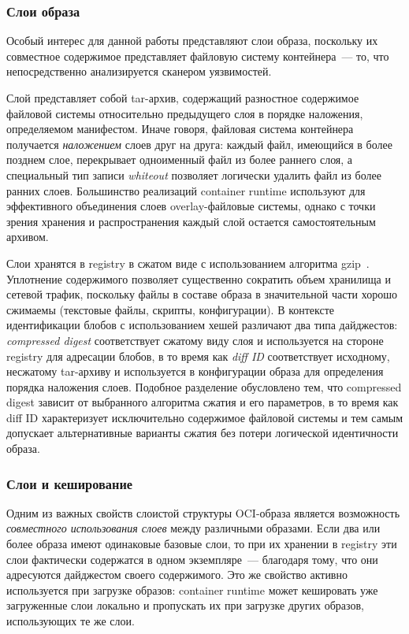 \subsubsection{Слои образа}

Особый интерес для данной работы представляют слои образа, поскольку их совместное содержимое представляет файловую систему контейнера~--- то, что непосредственно анализируется сканером уязвимостей.

Слой представляет собой tar-архив, содержащий разностное содержимое файловой системы относительно предыдущего слоя в порядке наложения, определяемом манифестом. Иначе говоря, файловая система контейнера получается \textit{наложением} слоев друг на друга: каждый файл, имеющийся в более позднем слое, перекрывает одноименный файл из более раннего слоя, а специальный тип записи \textit{whiteout} позволяет логически удалить файл из более ранних слоев. Большинство реализаций container runtime используют для эффективного объединения слоев overlay-файловые системы, однако с точки зрения хранения и распространения каждый слой остается самостоятельным архивом.

Слои хранятся в registry в сжатом виде с использованием алгоритма gzip~\cite{gzip}. Уплотнение содержимого позволяет существенно сократить объем хранилища и сетевой трафик, поскольку файлы в составе образа в значительной части хорошо сжимаемы (текстовые файлы, скрипты, конфигурации). В контексте идентификации блобов с использованием хешей различают два типа дайджестов: \textit{compressed digest} соответствует сжатому виду слоя и используется на стороне registry для адресации блобов, в то время как \textit{diff ID} соответствует исходному, несжатому tar-архиву и используется в конфигурации образа для определения порядка наложения слоев. Подобное разделение обусловлено тем, что compressed digest зависит от выбранного алгоритма сжатия и его параметров, в то время как diff ID характеризует исключительно содержимое файловой системы и тем самым допускает альтернативные варианты сжатия без потери логической идентичности образа.

\subsubsection{Слои и кеширование}

Одним из важных свойств слоистой структуры OCI-образа является возможность \textit{совместного использования слоев} между различными образами. Если два или более образа имеют одинаковые базовые слои, то при их хранении в registry эти слои фактически содержатся в одном экземпляре~--- благодаря тому, что они адресуются дайджестом своего содержимого. Это же свойство активно используется при загрузке образов: container runtime может кешировать уже загруженные слои локально и пропускать их при загрузке других образов, использующих те же слои.

